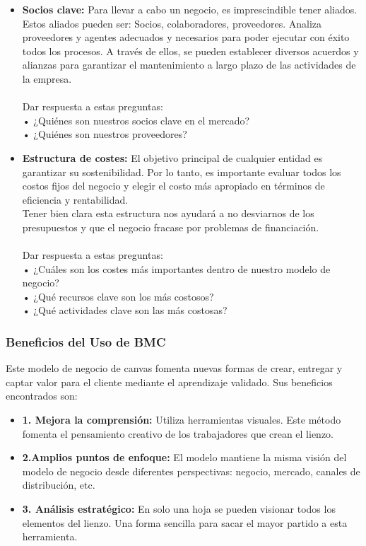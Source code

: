 \documentclass[preprint,12pt]{elsarticle}
\begin{document}
\begin{itemize}
	\item {\textbf{Socios clave: }} Para llevar a cabo un negocio, es imprescindible tener aliados.\cite{referenciasosa1}  Estos aliados pueden ser: Socios, colaboradores, proveedores. Analiza proveedores y agentes adecuados y necesarios para poder ejecutar con éxito todos los procesos. A través de ellos, se pueden establecer diversos acuerdos y alianzas para garantizar el mantenimiento a largo plazo de las actividades de la empresa. \\\\Dar respuesta a estas preguntas:\\ • ¿Quiénes son nuestros socios clave en el mercado? \\ • ¿Quiénes son nuestros proveedores?
	\item {\textbf{Estructura de costes: }}El objetivo principal de cualquier entidad es garantizar su sostenibilidad. Por lo tanto, es importante evaluar todos los costos fijos del negocio y elegir el costo más apropiado en términos de eficiencia y rentabilidad. \\ Tener bien clara esta estructura nos ayudará a no desviarnos de los presupuestos y que el negocio fracase por problemas de financiación.\cite{referenciasosa1}  \\\\Dar respuesta a estas preguntas:\\ •  ¿Cuáles son los costes más importantes dentro de nuestro modelo de negocio?\\ •  ¿Qué recursos clave son los más costosos? \\ • ¿Qué actividades clave son las más costosas?
	\end{itemize}

	\subsubsection{\textbf{Beneficios del Uso de BMC}}
Este modelo de negocio de canvas fomenta nuevas formas de crear, entregar y captar valor para el cliente mediante el aprendizaje validado. Sus beneficios encontrados son:
\begin{itemize}
	\item{\textbf{1. Mejora la comprensión: }}Utiliza herramientas visuales. Este método fomenta el pensamiento creativo de los trabajadores que crean el lienzo.
	\item {\textbf{2.Amplios puntos de enfoque: }}El modelo mantiene la misma visión del modelo de negocio desde diferentes perspectivas: negocio, mercado, canales de distribución, etc.
	\item {\textbf{3. Análisis estratégico: }}En solo una hoja se pueden visionar todos los elementos del lienzo. Una forma sencilla para sacar el mayor partido a esta herramienta.
	\end{itemize}
\end{document}
